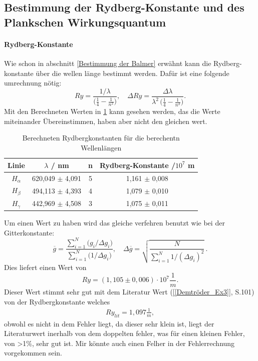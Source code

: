 \subsection{Bestimmung der Rydberg-Konstante und des Plankschen Wirkungsquantum}
\paragraph{Rydberg-Konstante} \label{Rydberg-konst}
Wie schon in abschnitt \ref{Bestimmung der Balmer} erwähnt kann die Rydberg-konstante über die wellen länge bestimmt werden.
Dafür ist eine folgende umrechnung nötig:
\begin{equation}
  Ry
  = \frac{1/\lambda}{\bigl(\tfrac{1}{4} - \tfrac{1}{n^{2}}\bigr)},
  \quad
  \Delta Ry
  = \frac{\Delta\lambda}{\lambda^{2}\,\bigl(\tfrac{1}{4} - \tfrac{1}{n^{2}}\bigr)}.
\end{equation}
Mit den Berechneten Werten in \cref{tab:Rydberg} kann gesehen werden, das die Werte miteinander Übereinstimmen, haben aber nicht den gleichen wert. 

\begin{table}[htbp]
    \centering
    \begin{tabular}{|c|c|c|c|}
        Linie & $\lambda$ / nm & n & Rydberg-Konstante /$10^7$ m \\
        \hline
        $H_\alpha$ & 620,049 $\pm$ 4,091 & 5 & 1,161 $\pm$ 0,008 \\
        $H_\beta$ & 494,113 $\pm$ 4,393 & 4 & 1,079 $\pm$ 0,010  \\
        $H_\gamma$ & 442,969 $\pm$ 4,508 & 3 & 1,075 $\pm$ 0,011 \\
    \end{tabular}
    \caption{Berechneten Rydbergkonstanten für die berechentn Wellenlängen}
    \label{tab:Rydberg}
\end{table}

Um einen Wert zu haben wird das gleiche verfehren benutzt wie bei der Gitterkonstante:
\begin{equation}
  \overline{g}
  = \frac{\sum_{i=1}^{N} \bigl(g_i/\Delta g_i\bigr)}
         {\sum_{i=1}^{N} \bigl(1/\Delta g_i\bigr)},
  \quad
  \Delta\overline{g}
  = \sqrt{\frac{N}{\sum_{i=1}^{N} 1/(\Delta g_i)^{2}}}\,.
\end{equation}
Dies liefert einen Wert von 
\begin{equation}
    Ry = (1,105 \pm 0,006)\cdot 10^7 \frac{1}{m}.
\end{equation}
Dieser Wert stimmt sehr gut mit dem Literatur Wert (\cref{[Demtröder_Ex3]}, S.101) von der Rydbergkonstante welches 
\begin{align}
    Ry_{lit} = 1,097 \frac{1}{m},
\end{align}
obwohl es nicht in dem Fehler liegt, da dieser sehr klein ist, liegt der Literaturwert inerhalb von dem doppelten fehler, was für einen kleinen Fehler, von >1$\%$, sehr gut ist.
Mir könnte auch einen Felher in der Fehlerrechnung vorgekommen sein.


